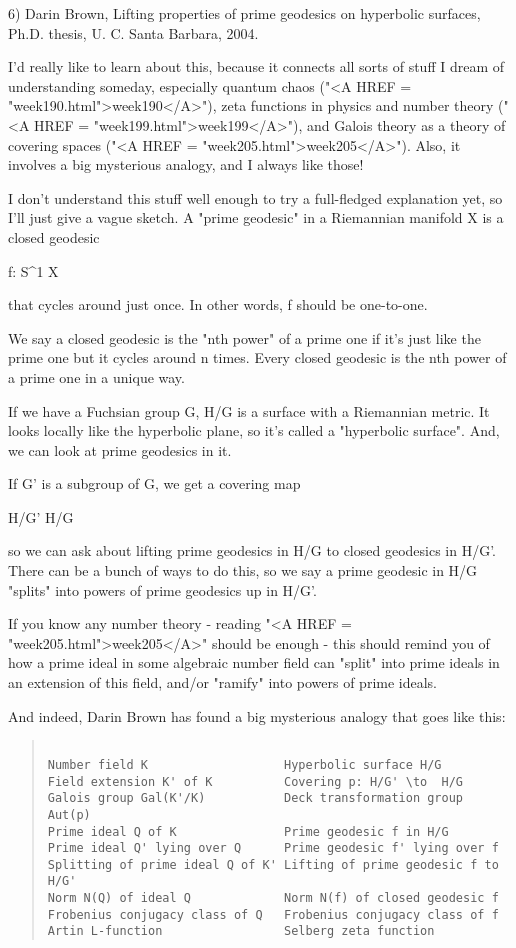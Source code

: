 6) Darin Brown, Lifting properties of prime geodesics on hyperbolic
surfaces, Ph.D. thesis, U. C. Santa Barbara, 2004.

I'd really like to learn about this, because it connects all sorts
of stuff I dream of understanding someday, especially quantum chaos 
("<A HREF = "week190.html">week190</A>"), zeta functions in physics and number theory ("<A HREF = "week199.html">week199</A>"), 
and Galois theory as a theory of covering spaces ("<A HREF = "week205.html">week205</A>").  Also, 
it involves a big mysterious analogy, and I always like those!

I don't understand this stuff well enough to try a full-fledged
explanation yet, so I'll just give a vague sketch.  A "prime geodesic"
in a Riemannian manifold X is a closed geodesic 

f: S^{1} \to  X

that cycles around just once.  In other words, f should be one-to-one.

We say a closed geodesic is the "nth power" of a prime one if it's
just like the prime one but it cycles around n times.  Every closed
geodesic is the nth power of a prime one in a unique way.

If we have a Fuchsian group G, H/G is a surface with a Riemannian
metric.  It looks locally like the hyperbolic plane, so it's called
a "hyperbolic surface".  And, we can look at prime geodesics in it.  

If G' is a subgroup of G, we get a covering map

H/G' \to  H/G

so we can ask about lifting prime geodesics in H/G to closed geodesics
in H/G'.   There can be a bunch of ways to do this, so we say a
prime geodesic in H/G "splits" into powers of prime geodesics up in
H/G'.  

If you know any number theory - reading "<A HREF = "week205.html">week205</A>" should be enough -
this should remind you of how a prime ideal in some algebraic number 
field can "split" into prime ideals in an extension of this field, 
and/or "ramify" into powers of prime ideals.

And indeed, Darin Brown has found a big mysterious analogy that goes 
like this:

\begin{quote}

\begin{verbatim}

Number field K                   Hyperbolic surface H/G
Field extension K' of K          Covering p: H/G' \to  H/G
Galois group Gal(K'/K)           Deck transformation group Aut(p)
Prime ideal Q of K               Prime geodesic f in H/G
Prime ideal Q' lying over Q      Prime geodesic f' lying over f
Splitting of prime ideal Q of K' Lifting of prime geodesic f to H/G'
Norm N(Q) of ideal Q             Norm N(f) of closed geodesic f
Frobenius conjugacy class of Q   Frobenius conjugacy class of f
Artin L-function                 Selberg zeta function
\end{verbatim}
    
\end{quote}

